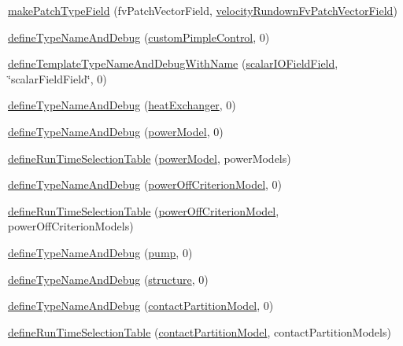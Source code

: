 \begin{DoxyCompactItemize}
\item 
\hyperlink{namespaceFoam_a1a58a5e974312d6b2dd55e698edf6895}{make\+Patch\+Type\+Field} (fv\+Patch\+Vector\+Field, \hyperlink{classFoam_1_1velocityRundownFvPatchVectorField}{velocity\+Rundown\+Fv\+Patch\+Vector\+Field})
\item 
\hyperlink{namespaceFoam_ab37dc372338c092d1a11c5105760e7f8}{define\+Type\+Name\+And\+Debug} (\hyperlink{classFoam_1_1customPimpleControl}{custom\+Pimple\+Control}, 0)
\item 
\hyperlink{namespaceFoam_a8b6880a1c00667344278ee7d0f07e08f}{define\+Template\+Type\+Name\+And\+Debug\+With\+Name} (\hyperlink{namespaceFoam_adbfd1f3f51dc7617aa2c901685a43266}{scalar\+I\+O\+Field\+Field}, \char`\"{}scalar\+Field\+Field\char`\"{}, 0)
\item 
\hyperlink{namespaceFoam_a40acadd72aae4ec664a4d929f6a7a03c}{define\+Type\+Name\+And\+Debug} (\hyperlink{classFoam_1_1heatExchanger}{heat\+Exchanger}, 0)
\item 
\hyperlink{namespaceFoam_ada763ab4438801dc5a90d723558d096c}{define\+Type\+Name\+And\+Debug} (\hyperlink{classFoam_1_1powerModel}{power\+Model}, 0)
\item 
\hyperlink{namespaceFoam_a18e8234b70032ba82a62808f85b28519}{define\+Run\+Time\+Selection\+Table} (\hyperlink{classFoam_1_1powerModel}{power\+Model}, power\+Models)
\item 
\hyperlink{namespaceFoam_ac046932d2ce8ccd26277d80052af1ad0}{define\+Type\+Name\+And\+Debug} (\hyperlink{classFoam_1_1powerOffCriterionModel}{power\+Off\+Criterion\+Model}, 0)
\item 
\hyperlink{namespaceFoam_a2393d851bfc4e5c1db84fa078e561f8c}{define\+Run\+Time\+Selection\+Table} (\hyperlink{classFoam_1_1powerOffCriterionModel}{power\+Off\+Criterion\+Model}, power\+Off\+Criterion\+Models)
\item 
\hyperlink{namespaceFoam_af75f7542ef35bb648205f506c66b1467}{define\+Type\+Name\+And\+Debug} (\hyperlink{classFoam_1_1pump}{pump}, 0)
\item 
\hyperlink{namespaceFoam_a5d7483bbd8dff1331747db25802e4473}{define\+Type\+Name\+And\+Debug} (\hyperlink{classFoam_1_1structure}{structure}, 0)
\item 
\hyperlink{namespaceFoam_ac611a00dc2f8b0def6326c9c39c387cc}{define\+Type\+Name\+And\+Debug} (\hyperlink{classFoam_1_1contactPartitionModel}{contact\+Partition\+Model}, 0)
\item 
\hyperlink{namespaceFoam_ae5ee66a821fe7447a264b9896646cd7e}{define\+Run\+Time\+Selection\+Table} (\hyperlink{classFoam_1_1contactPartitionModel}{contact\+Partition\+Model}, contact\+Partition\+Models)

\end{DoxyCompactItemize}
